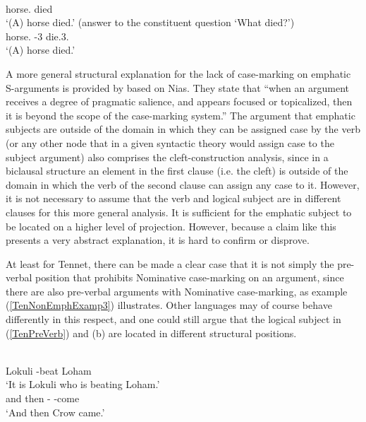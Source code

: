 \pagebreak

\begin{exe}\ex\label{ArbEmph1}
\begin{xlist}\ex\gll {} \\
horse.\pred{} died\\
\glt `(A) horse died.' (answer to the constituent question `What died?')
\ex\gll {}  \\
horse.\nom{} \pvs{}-3\sg{} die.3\sg{}.\fem{}\\
\glt `(A) horse died.'
\end{xlist} 
\end{exe}

A more general structural explanation for the lack of case-marking on emphatic S-arguments is provided by \citet[60]{Donohue.Brown:1999} based on Nias. 
They state that ``when an argument receives a degree of pragmatic salience, and appears focused or topicalized, then it is beyond the scope of the case-marking system.''
The argument that emphatic subjects are outside of the domain in which they can be assigned case by the verb (or any other node that in a given syntactic theory would assign case to the subject argument) also comprises the cleft-construction analysis, since in a biclausal structure an element in the first clause (i.e. the cleft) is outside of the domain in which the verb of the second clause can assign any case to it. 
However, it is not necessary to assume that the verb and logical subject are in different clauses for this more general analysis. 
It is sufficient for the emphatic subject to be located on a higher level of projection. 
However, because a claim like this presents a very abstract explanation, it is hard to confirm or disprove.

At least for Tennet, there can be made a clear case that it is not simply the pre-verbal position that prohibits Nominative case-marking on an argument, since there are also pre-verbal arguments with Nominative case-marking, as example (\ref{TenNonEmphExamp3}) illustrates. 
Other languages may of course behave differently in this respect, and one could still argue that the logical subject in (\ref{TenPreVerb}) and (b) are located in different structural positions.

\begin{exe}\ex{}
\begin{xlist}
\ex\label{TenPreVerb}\gll{}   \\
Lokuli \am{} \ipfv{}-beat Loham\\
\glt `It is Lokuli who is beating Loham.' 
\ex\label{TenNonEmphExamp3}\gll{}   \\
and then \propnoun-\nom{} \ipfv{}-come\\
\glt `And then Crow came.' \end{xlist}
\end{exe}

